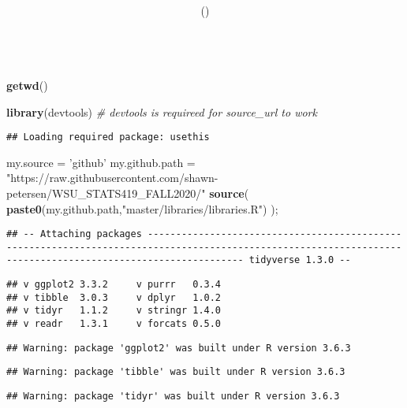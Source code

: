 \documentclass{article}
\title{\hmwkCourse \\ \hmwkTitle}
\author{\hmwkAuthor \\ (\hmwkEmail) \\ \hmwkWSU \\[0.5in] \hmwkInstructor }
\date{\hmwkDate}
\newenvironment{Shaded}{\begin{snugshade}}{\end{snugshade}}
\newcommand{\CommentTok}[1]{\textcolor[rgb]{0.56,0.35,0.01}{\textit{#1}}}
\newcommand{\KeywordTok}[1]{\textcolor[rgb]{0.13,0.29,0.53}{\textbf{#1}}}
\newcommand{\NormalTok}[1]{#1}
\newcommand{\StringTok}[1]{\textcolor[rgb]{0.31,0.60,0.02}{#1}}
\begin{document}
\maketitle



\begin{Shaded}
\begin{Highlighting}[]
\KeywordTok{getwd}\NormalTok{()}

\KeywordTok{library}\NormalTok{(devtools)  }\CommentTok{# devtools is requireed for source_url to work}
\end{Highlighting}
\end{Shaded}

\begin{verbatim}
## Loading required package: usethis
\end{verbatim}

\begin{Shaded}
\begin{Highlighting}[]
\NormalTok{my.source =}\StringTok{ 'github'}
\NormalTok{my.github.path =}\StringTok{ "https://raw.githubusercontent.com/shawn-petersen/WSU_STATS419_FALL2020/"}
\KeywordTok{source}\NormalTok{( }\KeywordTok{paste0}\NormalTok{(my.github.path,}\StringTok{"master/libraries/libraries.R"}\NormalTok{) );}
\end{Highlighting}
\end{Shaded}

\begin{verbatim}
## -- Attaching packages ------------------------------------------------------------------------------------------------------------------------------------------------------------- tidyverse 1.3.0 --
\end{verbatim}

\begin{verbatim}
## v ggplot2 3.3.2     v purrr   0.3.4
## v tibble  3.0.3     v dplyr   1.0.2
## v tidyr   1.1.2     v stringr 1.4.0
## v readr   1.3.1     v forcats 0.5.0
\end{verbatim}

\begin{verbatim}
## Warning: package 'ggplot2' was built under R version 3.6.3
\end{verbatim}

\begin{verbatim}
## Warning: package 'tibble' was built under R version 3.6.3
\end{verbatim}

\begin{verbatim}
## Warning: package 'tidyr' was built under R version 3.6.3
\end{verbatim}
\end{document}
